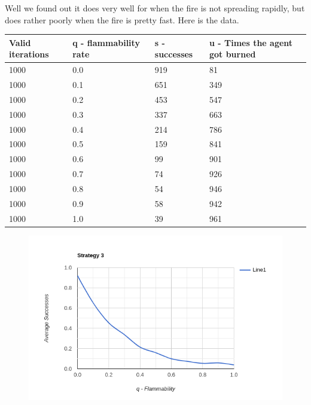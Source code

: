 \documentclass[11pt]{scrartcl} %
\begin{document}
Well we found out it does very well for when the fire is not spreading rapidly, but does rather poorly when the fire is pretty fast. Here is the data.\\

\begin{table}[!htb]
\begin{tabular}{|l|l|l|l|}
\hline
\textbf{Valid iterations} & \textbf{q - flammability rate} & \textbf{s - successes} & \textbf{u - Times the agent got burned} \\ \hline
1000 & 0.0   & 919 & 81  \\ \hline
1000 & 0.1 & 651 & 349 \\ \hline
1000 & 0.2 & 453 & 547 \\ \hline
1000 & 0.3 & 337 & 663 \\ \hline
1000 & 0.4 & 214 & 786 \\ \hline
1000 & 0.5 & 159 & 841 \\ \hline
1000 & 0.6 & 99  & 901 \\ \hline
1000 & 0.7 & 74  & 926 \\ \hline
1000 & 0.8 & 54  & 946 \\ \hline
1000 & 0.9 & 58  & 942 \\ \hline
1000 & 1.0   & 39  & 961 \\ \hline
\end{tabular}
\end{table}

\begin{figure}[H]
 	\centering
  	\includegraphics*[scale=0.8]{strategy3.png}
	\label{fig:example}
 \end{figure}
\end{document}
